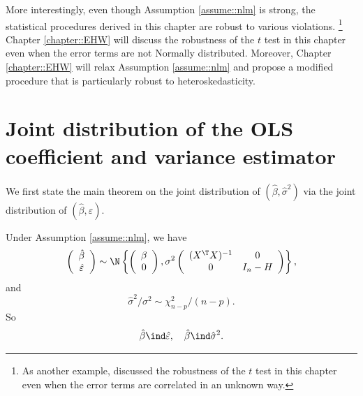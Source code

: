 More interestingly, even though Assumption \ref{assume::nlm} is strong, the statistical procedures derived in this chapter are robust to various violations. 
\footnote{
As another example, \citet{zhang2025random} discussed the robustness of the $t$ test in this chapter even when the error terms are correlated in an unknown way.
}  
Chapter \ref{chapter::EHW} will discuss the robustness of the $t$ test in this chapter even when the error terms are not Normally distributed. Moreover,  Chapter \ref{chapter::EHW} will relax Assumption \ref{assume::nlm} and propose a modified procedure that is particularly robust to heteroskedasticity.






\section{Joint distribution of the OLS coefficient and variance estimator}

We first state the main theorem on the joint distribution of $(\hat{\beta},\hat{\sigma}^{2})$
via the joint distribution of $(\hat{\beta},\hat{\varepsilon}).$
\begin{theorem}
\label{thm:normalexactdistribution}Under Assumption \ref{assume::nlm}, we have 
\[
\left(\begin{array}{c}
\hat{\beta}\\
\hat{\varepsilon}
\end{array}\right)\sim\N\left\{ \left(\begin{array}{c}
\beta\\
0
\end{array}\right),\sigma^{2}\left(\begin{array}{cc}
(X^{\T}X)^{-1} & 0\\
0 & I_{n}-H
\end{array}\right)\right\} ,
\]
and
$$
\hat{\sigma}^{2}/\sigma^{2}\sim\chi_{n-p}^{2}/(n-p).
$$
So 
$$
\hat{\beta}\ind\hat{\varepsilon} ,\quad 
 \hat{\beta}\ind\hat{\sigma}^{2}  .
$$
\end{theorem}
 
